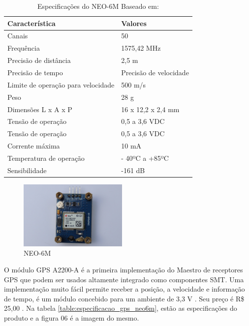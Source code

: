 \begin{table}[ht]
 \caption{Especificações do NEO-6M Baseado em: \cite{13gps}}
 \centering
 \begin{tabular}{| l |  p{5cm} |}
 \hline
 Característica & Valores \\
 \hline
 Canais & 50 \\
 \hline
 Frequência & 1575,42 MHz \\
 \hline
 Precisão de distância & 2,5 m \\
 \hline
 Precisão de tempo & Precisão de velocidade \\
 \hline
 Limite de operação para velocidade & 500 m/s \\
 \hline
 Peso & 28 g \\
 \hline
 Dimensões L x A x P & 16 x 12,2 x 2,4 mm \\
 \hline
 Tensão de operação & 0,5 a 3,6 VDC \\
 \hline
 Tensão de operação & 0,5 a 3,6 VDC \\
 \hline
 Corrente máxima & 10 mA \\
 \hline
 Temperatura de operação & - 40ºC a +85ºC \\
 \hline
 Sensibilidade & -161 dB \\
 \hline
 \end{tabular}
 \label{table:especificacao_gps_neo}
 \end{table}

 \begin{figure}[h]
   \centering
   \includegraphics[width=200px, scale=1]{figuras/gps_neo}
   \caption{NEO-6M  \cite{14gps}}
 \label{fig:gps_neo}
 \end{figure}

 O módulo GPS A2200-A é a primeira implementação do Maestro de receptores
 GPS que podem ser usados altamente integrado como componentes SMT. Uma
 implementação muito fácil permite
 receber a posição, a velocidade e informação de tempo, é um módulo concebido
 para um ambiente de 3,3 V \cite{15gps}. Seu preço é R\$ 25,00 \cite{16gps}. Na tabela \ref{table:especificacao_gps_neo6m},
 estão as especificações do produto e a figura 06 é a imagem do mesmo.

